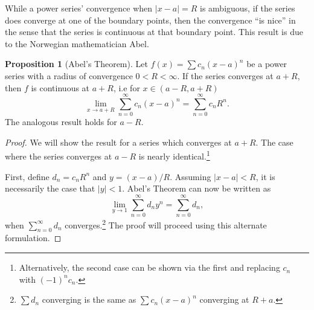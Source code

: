 \documentclass{article}
\theoremstyle{definition}
\newtheorem{proposition}{Proposition}[section]
\begin{document}
While a power series' convergence when $ |x-a|=R $ is ambiguous, if the series does converge at one of the boundary points, then the convergence ``is nice'' in the sense that the series is continuous at that boundary point. This result is due to the Norwegian mathematician Abel. 
\begin{proposition}[Abel's Theorem]
	Let $ f(x)=\sum c_n(x-a)^n $ be a power series with a radius of convergence $ 0<R<\infty $.  If the series converges at $ a+R $, then $ f $ is continuous at $ a+R $, i.e for $ x\in(a-R,a+R) $ 
	$$ \lim\limits_{x\to a + R}\sum_{n=0}^{\infty}c_n(x-a)^n = \sum_{n=0}^\infty c_nR^n  .$$
	The analogous result holds for $ a-R $.
\end{proposition}
\begin{proof}
	We will show the result for a series which converges at $ a+R $. The case where the series converges at $ a-R $ is nearly identical.\footnote{Alternatively, the second case can be shown via the first and replacing $ c_n $ with $ (-1)^nc_n$.}
	
	First, define $ d_n = c_nR^n $ and $ y=(x-a)/R $. Assuming $ |x-a|<R $, it is necessarily the case that $ |y|<1 $. Abel's Theorem can now be written as $$ \lim\limits_{y\to 1}\sum_{n=0}^{\infty}d_ny^n= \sum_{n=0}^{\infty}d_n,$$ when $  \sum_{n=0}^{\infty}d_n $ converges.\footnote{$  \sum d_n $ converging is the same as $ \sum c_n(x-a)^n $ converging at $ R+a $.} The proof will proceed using this alternate formulation.  
	

\end{proof}
\end{document}
